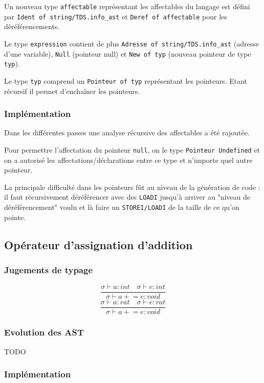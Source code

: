 \documentclass[headings=standardclasses,parskip=half]{scrartcl}
\begin{document}
Un nouveau type \texttt{affectable} représentant les affectables du
langage est défini par \texttt{Ident of string/TDS.info\_ast} et
\texttt{Deref of affectable} pour les déréférencements.

Le type \texttt{expression} contient de plus
\texttt{Adresse of string/TDS.info\_ast} (adresse d'une variable),
\texttt{Null} (pointeur null) et \texttt{New of typ} (nouveau pointeur
de type \texttt{typ}).

Le type \texttt{typ} comprend un \texttt{Pointeur of typ} représentant
les pointeurs. Etant récursif il permet d'enchaîner les pointeurs.

\subsubsection*{Implémentation}

Dans les différentes passes une analyse récursive des affectables
a été rajoutée.

Pour permettre l'affectation du pointeur \texttt{null},
on le type \texttt{Pointeur Undefined}
et on a autorisé les affectations/déclarations entre ce type
et n'importe quel autre pointeur.

La principale difficulté dans les pointeurs fût au niveau de
la génération de code : il faut récursivement déréférencer avec des
\texttt{LOADI} jusqu'à arriver au "niveau de déréférencement" voulu
et là faire un \texttt{STOREI/LOADI} de la taille de ce qu'on pointe.

\subsection{Opérateur d'assignation d'addition}

\subsubsection*{Jugements de typage}

\[\frac{\sigma \vdash a : int \quad \sigma \vdash e : int}
    {\sigma \vdash a \mathrel{+}= e : void}\]
\[\frac{\sigma \vdash a : rat \quad \sigma \vdash e : rat}
    {\sigma \vdash a \mathrel{+}= e : void}\]

\subsubsection*{Evolution des AST}

TODO

\subsubsection*{Implémentation}
\end{document}

